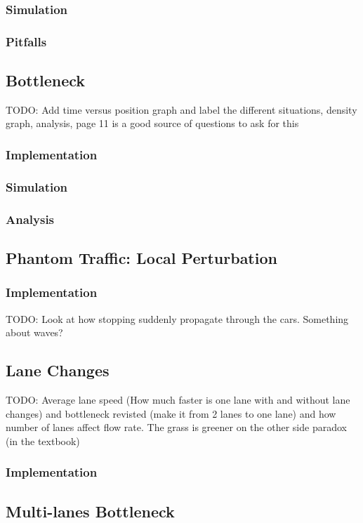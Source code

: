 \documentclass[12pt]{article}
\begin{document}
    \subsubsection{Simulation}
    \subsubsection{Pitfalls}
    \subsection{Bottleneck}
    TODO: Add time versus position graph and label the different situations, density graph, analysis, page 11 is a good source of questions to ask for this 
    \subsubsection{Implementation}
    \subsubsection{Simulation}
    \subsubsection{Analysis}
    \subsection{Phantom Traffic: Local Perturbation}
    \subsubsection{Implementation}
    TODO: Look at how stopping suddenly propagate through the cars. Something about waves? 
    \subsection{Lane Changes}
    TODO: Average lane speed (How much faster is one lane with and without lane changes) and bottleneck revisted (make it from 2 lanes to one lane) and how number of lanes affect flow rate. The grass is greener on the other side paradox (in the textbook) 
    \subsubsection{Implementation}
    \subsection{Multi-lanes Bottleneck}
\end{document}
